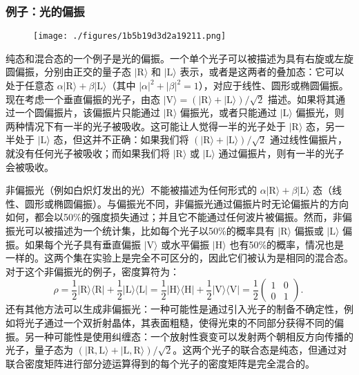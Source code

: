 \subsubsection{例子：光的偏振}
\begin{figure}[ht]
\centering
\texttt{[image: ./figures/1b5b19d3d2a19211.png]}
\caption{} \label{fig_MDJZ_3}
\end{figure}
纯态和混合态的一个例子是光的偏振。一个单个光子可以被描述为具有右旋或左旋圆偏振，分别由正交的量子态 \( |\mathrm{R} \rangle \) 和 \( |\mathrm{L} \rangle \) 表示，或者是这两者的叠加态：它可以处于任意态 \( \alpha |\mathrm{R} \rangle + \beta |\mathrm{L} \rangle \)（其中 \( |\alpha|^2 + |\beta|^2 = 1 \)），对应于线性、圆形或椭圆偏振。现在考虑一个垂直偏振的光子，由态 \( |\mathrm{V} \rangle = (|\mathrm{R} \rangle + |\mathrm{L} \rangle)/\sqrt{2} \) 描述。如果将其通过一个圆偏振片，该偏振片只能通过 \( |\mathrm{R} \rangle \) 偏振光，或者只能通过 \( |\mathrm{L} \rangle \) 偏振光，则两种情况下有一半的光子被吸收。这可能让人觉得一半的光子处于 \( |\mathrm{R} \rangle \) 态，另一半处于 \( |\mathrm{L} \rangle \) 态，但这并不正确：如果我们将 \( (|\mathrm{R} \rangle + |\mathrm{L} \rangle)/\sqrt{2} \) 通过线性偏振片，就没有任何光子被吸收；而如果我们将 \( |\mathrm{R} \rangle \) 或 \( |\mathrm{L} \rangle \) 通过偏振片，则有一半的光子会被吸收。

非偏振光（例如白炽灯发出的光）不能被描述为任何形式的 \( \alpha |\mathrm{R} \rangle + \beta |\mathrm{L} \rangle \) 态（线性、圆形或椭圆偏振）。与偏振光不同，非偏振光通过偏振片时无论偏振片的方向如何，都会以50\%的强度损失通过；并且它不能通过任何波片被偏振。然而，非偏振光可以被描述为一个统计集，比如每个光子以50\%的概率具有 \( |\mathrm{R} \rangle \) 偏振或 \( |\mathrm{L} \rangle \) 偏振。如果每个光子具有垂直偏振 \( |\mathrm{V} \rangle \) 或水平偏振 \( |\mathrm{H} \rangle \) 也有50\%的概率，情况也是一样的。这两个集在实验上是完全不可区分的，因此它们被认为是相同的混合态。对于这个非偏振光的例子，密度算符为：
\[
\rho = \frac{1}{2} |\mathrm{R} \rangle \langle \mathrm{R} | + \frac{1}{2} |\mathrm{L} \rangle \langle \mathrm{L} | = \frac{1}{2} |\mathrm{H} \rangle \langle \mathrm{H} | + \frac{1}{2} |\mathrm{V} \rangle \langle \mathrm{V} | = \frac{1}{2} \begin{pmatrix} 1 & 0 \\ 0 & 1 \end{pmatrix}.~
\]
还有其他方法可以生成非偏振光：一种可能性是通过引入光子的制备不确定性，例如将光子通过一个双折射晶体，其表面粗糙，使得光束的不同部分获得不同的偏振。另一种可能性是使用纠缠态：一个放射性衰变可以发射两个朝相反方向传播的光子，量子态为 \( (|\mathrm{R}, \mathrm{L} \rangle + |\mathrm{L}, \mathrm{R} \rangle)/\sqrt{2} \)。这两个光子的联合态是纯态，但通过对联合密度矩阵进行部分迹运算得到的每个光子的密度矩阵是完全混合的。
